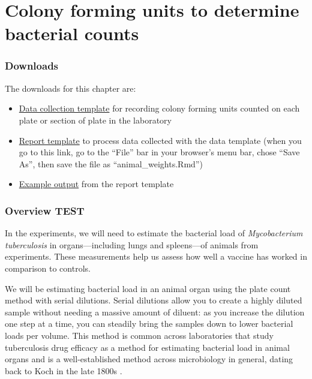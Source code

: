 \documentclass[
]{book}
\providecommand{\tightlist}{%
  \setlength{\itemsep}{0pt}\setlength{\parskip}{0pt}}
\begin{document}
\chapter{Colony forming units to determine bacterial counts}\label{colony-forming-units-to-determine-bacterial-counts}

\subsection{Downloads}\label{downloads-1}

The downloads for this chapter are:

\begin{itemize}
\tightlist
\item
  \href{https://github.com/csu-impactb/CODING-TEAM-BOOKDOWN-/raw/main/templates/data_collection_templates/cfu_collection_template.xlsx}{Data collection template} for recording colony forming units counted on each
  plate or section of plate in the laboratory
\item
  \href{https://raw.githubusercontent.com/csu-impactb/CODING-TEAM-BOOKDOWN-/main/templates/report_templates/cfu_report.Rmd}{Report template} to process data collected with the data template (when you go to this link, go to the ``File'' bar in your browser's menu bar, chose ``Save As'', then save the file as ``animal\_weights.Rmd'')
\item
  \href{https://github.com/csu-impactb/CODING-TEAM-BOOKDOWN-/raw/main/templates/report_templates/cfu_report.docx}{Example output} from the report template
\end{itemize}

\subsection{Overview TEST}\label{overview-test}

In the experiments, we will need to estimate the bacterial load of
\emph{Mycobacterium tuberculosis} in organs---including lungs and spleens---of
animals from experiments. These measurements help us assess how well a vaccine
has worked in comparison to controls.

We will be estimating bacterial load in an animal organ using the plate count
method with serial dilutions. Serial dilutions allow you to create a
highly diluted sample without needing a massive amount of diluent: as you
increase the dilution one step at a time, you can steadily bring the samples
down to lower bacterial loads per volume. This method is common across
laboratories that study tuberculosis drug efficacy as a method for estimating
bacterial load in animal organs \citep{franzblau2012comprehensive} and is a
well-established method across microbiology in general, dating back to Koch in
the late 1800s \citep{wilson1922proportion, ben2014estimation}.
\end{document}
